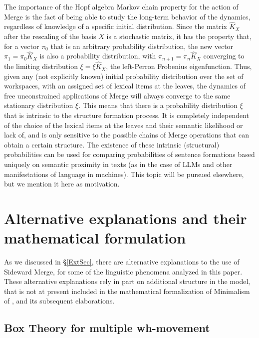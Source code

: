 \documentclass[12pt]{amsart}
\numberwithin{equation}{section}
\begin{document}
\medskip

The importance of the Hopf algebra Markov chain property for the action of Merge is
the fact of being able to study the long-term behavior of the dynamics, regardless
of knowledge of a specific initial distribution. Since the matrix $\hat K_X$ after the
rescaling of the basis $X$ is a stochastic matrix, it has the property that, for a vector
$\pi_0$ that is an arbitrary probability distribution, the new vector $\pi_1 = \pi_0 \hat K_X$
is also a probability distribution, with $\pi_{n+1}=\pi_n \hat K_X$ converging to the
limiting distribution $\xi = \xi \hat K_X$, the left-Perron Frobenius
eigenfunction. Thus, given any (not explicitly known) initial probability distribution
over the set of workspaces, with an assigned set of lexical items at the leaves, the
dynamics of free unconstrained applications of Merge will always converge to the
same stationary distribution $\xi$. This means that there is a probability distribution $\xi$
that is intrinsic to the structure formation process. It is completely independent of
the choice of the lexical items at the leaves and their semantic likelihood or lack of,
and is only sensitive to the possible chains of Merge operations that can obtain
a certain structure. The existence of these intrinsic (structural) probabilities can
 be used for comparing probabilities of sentence formations based uniquely on
 semantic proximity in texts (as in the case of LLMs and other manifestations
 of language in machines). This topic will be pursued elsewhere, but we
 mention it here as motivation. 



\section{Alternative explanations and their mathematical formulation} \label{ThSec} 

As we discussed in \S \ref{ExtSec}, there are alternative explanations to the
use of Sideward Merge, for some of the linguistic phenomena analyzed in this paper. 
These alternative explanations rely in part on additional structure in the model, that is
not at present included in the mathematical formalization of Minimalism
of \cite{MCB}, and its subsequent elaborations. 

\smallskip
\subsection{Box Theory for multiple wh-movement}\label{BoxSec}
\end{document}

